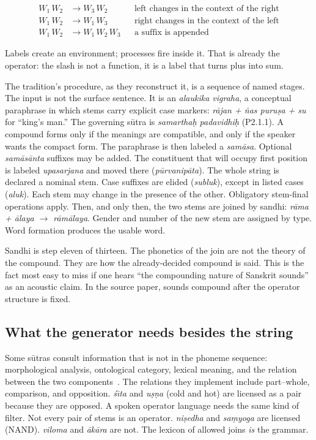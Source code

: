 \documentclass[manuscript, review, anonymous]{acmart}
\begin{document}
\begin{align}
W_1\,W_2 &\rightarrow W_3\,W_2 && \text{left changes in the context of the right} \label{eq:rightctx}\\
W_1\,W_2 &\rightarrow W_1\,W_3 && \text{right changes in the context of the left} \label{eq:leftctx}\\
W_1\,W_2 &\rightarrow W_1\,W_2\,W_3 && \text{a suffix is appended} \label{eq:append}
\end{align}

Labels create an environment; processes fire inside it. That is already the operator: the slash is not a function, it is a label that turns plus into sum.

The tradition's procedure, as they reconstruct it, is a sequence of named stages. The input is not the surface sentence. It is an \textit{alaukika vigraha}, a conceptual paraphrase in which stems carry explicit case markers: \textit{r{\=a}jan + {\.n}as puru{\d{s}}a + su} for ``king's man.'' The governing s{\=u}tra is \textit{samartha{\d{h}} padavidhi{\d{h}}} (P2.1.1). A compound forms only if the meanings are compatible, and only if the speaker wants the compact form. The paraphrase is then labeled a \textit{sam{\=a}sa}. Optional \textit{sam{\=a}s{\=a}nta} suffixes may be added. The constituent that will occupy first position is labeled \textit{upasarjana} and moved there (\textit{p{\=u}rvanip{\=a}ta}). The whole string is declared a nominal stem. Case suffixes are elided (\textit{subluk}), except in listed cases (\textit{aluk}). Each stem may change in the presence of the other. Obligatory stem-final operations apply. Then, and only then, the two stems are joined by sandhi: \textit{r{\=a}ma + {\=a}laya $\rightarrow$ r{\=a}m{\=a}laya}. Gender and number of the new stem are assigned by type. Word formation produces the usable word.

Sandhi is step eleven of thirteen. The phonetics of the join are not the theory of the compound. They are how the already-decided compound is said. This is the fact most easy to miss if one hears ``the compounding nature of Sanskrit sounds'' as an acoustic claim. In the source paper, sounds compound after the operator structure is fixed.

\subsection{What the generator needs besides the string}

Some s{\=u}tras consult information that is not in the phoneme sequence: morphological analysis, ontological category, lexical meaning, and the relation between the two components~\cite{Satuluri2013Generation}. The relations they implement include part--whole, comparison, and opposition. \textit{{\'s}{\=\i}ta} and \textit{u{\d{s}}{\d{n}}a} (cold and hot) are licensed as a pair because they are opposed. A spoken operator language needs the same kind of filter. Not every pair of stems is an operator. \textit{ni{\d{s}}edha} and \textit{sa{\d{m}}yoga} are licensed (NAND). \textit{viloma} and \textit{{\=a}k{\=a}ra} are not. The lexicon of allowed joins \emph{is} the grammar.
\end{document}

